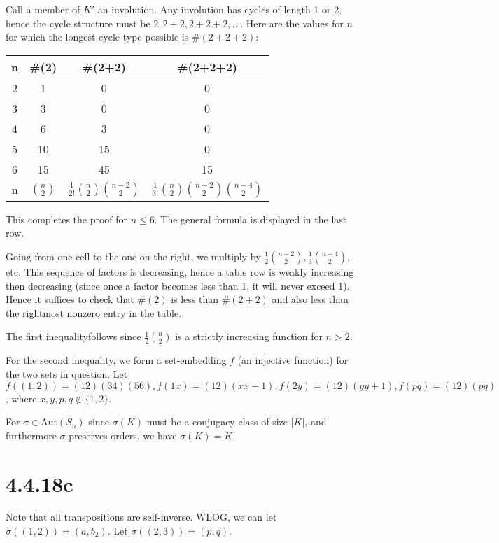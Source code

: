 \documentclass{article}
\def\Aut{\textrm{Aut}}
\begin{document}
Call a member of $K'$ an involution. Any involution has cycles of length 1 or 2, hence the cycle structure must be $2, 2+2, 2+2+2, \ldots$. Here are the values for $n$ for which the longest cycle type possible is $\#(2+2+2)$:

\begin{tabular}{ |c|c|c|c| } 
    \hline
    n & \#(2) & \#(2+2) & \#(2+2+2) \\
    \hline
    2 & 1 & 0 & 0 \\ 
    3 & 3 & 0 & 0 \\ 
    4 & 6 & 3 & 0 \\ 
    5 & 10 & 15 & 0 \\ 
    6 & 15 & 45 & 15 \\ 
    \hline
    n & ${n \choose 2}$ & $\frac{1}{2!}{n \choose 2}{n-2 \choose 2}$ & $\frac{1}{3!}{n \choose 2}{n-2 \choose 2}{n-4 \choose 2}$ \\
    \hline
\end{tabular}

This completes the proof for $n \le 6$. The general formula is displayed in the last row.

Going from one cell to the one on the right, we multiply by $\frac{1}{2}{n-2 \choose 2}, \frac{1}{3}{n-4 \choose 2}$, etc. This sequence of factors is decreasing, hence a table row is weakly increasing then decreasing (since once a factor becomes less than 1, it will never exceed 1). Hence it suffices to check that $\#(2)$ is less than $\#(2+2)$ and also less than the rightmost nonzero entry in the table.

The first inequalityfollows since $\frac{1}{2}{n \choose 2}$ is a strictly increasing function for $n > 2$.

For the second inequality, we form a set-embedding $f$ (an injective function) for the two sets in question. Let $f((1, 2)) = (1 2)(3 4)(5 6), f(1 x) = (1 2)(x x+1), f(2 y) = (1 2)(y y+1), f(p q) = (1 2)(p q)$, where $x, y, p, q \not\in \{1, 2\}$.

For $\sigma \in \Aut(S_n)$ since $\sigma(K)$ must be a conjugacy class of size $|K|$, and furthermore $\sigma$ preserves orders, we have $\sigma(K) = K$.

\section*{4.4.18c}

Note that all transpositions are self-inverse. WLOG, we can let $\sigma((1, 2)) = (a, b_2)$. Let $\sigma((2, 3)) = (p, q)$.
\end{document}
